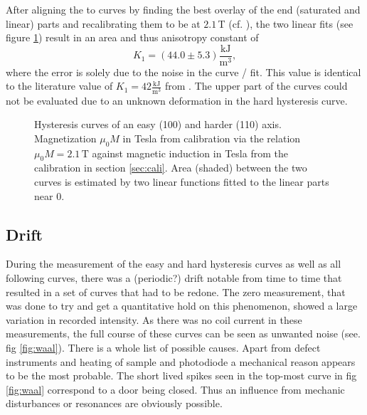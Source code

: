 \documentclass[a4paper]{scrartcl}
\numberwithin{equation}{section}
\numberwithin{figure}{section}
\numberwithin{table}{section}
\newcommand{\eq}[2]{\begin{equation}#1\label{#2}\end{equation}}
\begin{document}
After aligning the to curves by finding the best overlay of the end (saturated and linear) parts and recalibrating them to be at $2.1\,$T (cf. \cite{skript}), the two linear fits (see figure \ref{fig:ani}) result in an area and thus anisotropy constant of
\eq{K_1 = (44.0\pm 5.3)\frac{\text{kJ}}{\text{m}^3},}{} 
where the error is solely due to the noise in the curve / fit. This value is identical to the literature value of $K_1=42\frac{\text{kJ}}{\text{m}^3}$ from \cite{kittel}. The upper part of the curves could not be evaluated due to an unknown deformation in the hard hysteresis curve. 
\begin{figure} 
 \centering
{}

\caption{
\small Hysteresis curves of an easy (100) and harder (110) axis. Magnetization $\mu_0 M$ in Tesla from calibration via the relation $\mu_0 M = 2.1\,\text{T}$ against magnetic induction in Tesla from the calibration in section \ref{sec:cali}. Area (shaded) between the two curves is estimated by two linear functions fitted to the linear parts near 0. } 
	\label{fig:ani}
\end{figure}


\subsection{Drift}
During the measurement of the easy and hard hysteresis curves as well as all following curves, there was a (periodic?) drift notable from time to time that resulted in a set of curves that had to be redone. The zero measurement, that was done to try and get a quantitative hold on this phenomenon, showed a large variation in recorded intensity. As there was no coil current in these measurements, the full course of these curves can be seen as unwanted noise (see. fig \ref{fig:waal}). There is a whole list of possible causes. Apart from defect instruments and heating of sample and photodiode a mechanical reason appears to be the most probable. The short lived spikes seen in the top-most curve in fig \ref{fig:waal} correspond to a door being closed. Thus an influence from mechanic disturbances or resonances are obviously possible.
\end{document}
